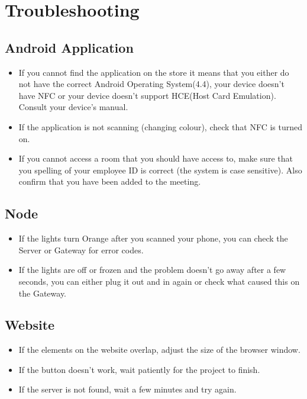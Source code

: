 \documentclass[a4paper,12pt,titlepage]{article}
\begin{document}
\newpage
\section{Troubleshooting}
\subsection{Android Application}
\begin{itemize}
    \item If you cannot find the application on the store it means that you either do not have the correct Android Operating System(4.4), your device doesn't have NFC or your device doesn't support HCE(Host Card Emulation). Consult your device's manual.
    \item If the application is not scanning (changing colour), check that NFC is turned on.
    \item If you cannot access a room that you should have access to, make sure that you spelling of your employee ID is correct (the system is case sensitive). Also confirm that you have been added to the meeting.
\end{itemize}

\subsection{Node}
\begin{itemize}
    \item If the lights turn Orange after you scanned your phone, you can check the Server or Gateway for error codes.
    \item If the lights are off or frozen and the problem doesn't go away after a few seconds, you can either plug it out and in again or check what caused this on the Gateway.
\end{itemize}


\subsection{Website}
\begin{itemize}
    \item If the elements on the website overlap, adjust the size of the browser window.
    \item If the button doesn't work, wait patiently for the project to finish.
    \item If the server is not found, wait a few minutes and try again.
\end{itemize}
\end{document}
